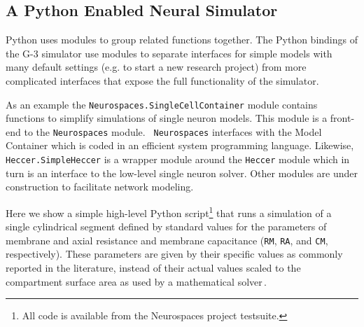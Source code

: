 \documentclass[10pt]{article}
\begin{document}
\subsection*{A Python Enabled Neural Simulator}

Python uses modules to group related functions together.  The Python
bindings of the G-3 simulator use modules to separate interfaces for
simple models with many default settings (e.g. to start a new research
project) from more complicated interfaces that expose the full
functionality of the simulator.

As an example the {\tt Neurospaces.SingleCellContainer} module
contains functions to simplify simulations of single neuron models.
This module is a front-end to the {\tt Neurospaces} module.  {\tt
  Neurospaces} interfaces with the Model Container which is coded in
an efficient system programming language.  Likewise, {\tt
  Heccer.SimpleHeccer} is a wrapper module around the {\tt Heccer}
module which in turn is an interface to the low-level single neuron
solver.  Other modules are under construction to facilitate network
modeling.

Here we show a simple high-level Python script\footnote{All code is
  available from the Neurospaces project testsuite.} that runs a
simulation of a single cylindrical segment defined by standard values
for the parameters of membrane and axial resistance and membrane
capacitance ({\tt RM}, {\tt RA},
and {\tt CM}, respectively).  These parameters are given by their
specific values as commonly reported in the literature, instead of
their actual values scaled to the compartment surface area as used by
a mathematical solver\,\cite{cornelis04:_neuros_param_handl}.
\end{document}
